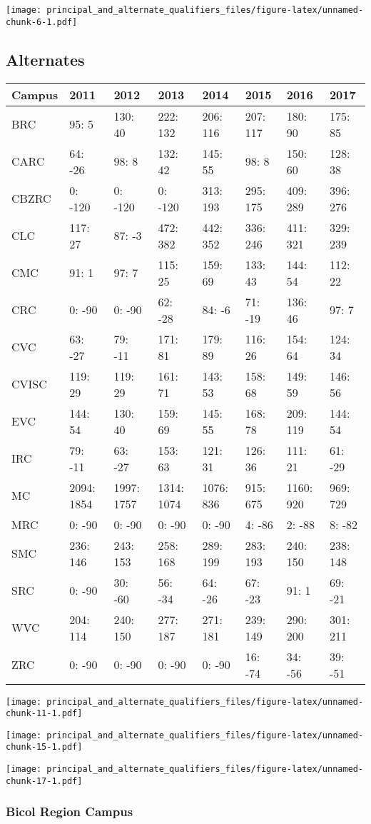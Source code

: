 \documentclass[]{article}
\begin{document}
\texttt{[image: principal\_and\_alternate\_qualifiers\_files/figure-latex/unnamed-chunk-6-1.pdf]}

\hypertarget{alternates}{%
\subsection{Alternates}\label{alternates}}

\begin{longtable}[]{@{}llllllll@{}}
\toprule
Campus & 2011 & 2012 & 2013 & 2014 & 2015 & 2016 & 2017\tabularnewline
\midrule
\endhead
BRC & 95: 5 & 130: 40 & 222: 132 & 206: 116 & 207: 117 & 180: 90 & 175:
85\tabularnewline
CARC & 64: -26 & 98: 8 & 132: 42 & 145: 55 & 98: 8 & 150: 60 & 128:
38\tabularnewline
CBZRC & 0: -120 & 0: -120 & 0: -120 & 313: 193 & 295: 175 & 409: 289 &
396: 276\tabularnewline
CLC & 117: 27 & 87: -3 & 472: 382 & 442: 352 & 336: 246 & 411: 321 &
329: 239\tabularnewline
CMC & 91: 1 & 97: 7 & 115: 25 & 159: 69 & 133: 43 & 144: 54 & 112:
22\tabularnewline
CRC & 0: -90 & 0: -90 & 62: -28 & 84: -6 & 71: -19 & 136: 46 & 97:
7\tabularnewline
CVC & 63: -27 & 79: -11 & 171: 81 & 179: 89 & 116: 26 & 154: 64 & 124:
34\tabularnewline
CVISC & 119: 29 & 119: 29 & 161: 71 & 143: 53 & 158: 68 & 149: 59 & 146:
56\tabularnewline
EVC & 144: 54 & 130: 40 & 159: 69 & 145: 55 & 168: 78 & 209: 119 & 144:
54\tabularnewline
IRC & 79: -11 & 63: -27 & 153: 63 & 121: 31 & 126: 36 & 111: 21 & 61:
-29\tabularnewline
MC & 2094: 1854 & 1997: 1757 & 1314: 1074 & 1076: 836 & 915: 675 & 1160:
920 & 969: 729\tabularnewline
MRC & 0: -90 & 0: -90 & 0: -90 & 0: -90 & 4: -86 & 2: -88 & 8:
-82\tabularnewline
SMC & 236: 146 & 243: 153 & 258: 168 & 289: 199 & 283: 193 & 240: 150 &
238: 148\tabularnewline
SRC & 0: -90 & 30: -60 & 56: -34 & 64: -26 & 67: -23 & 91: 1 & 69:
-21\tabularnewline
WVC & 204: 114 & 240: 150 & 277: 187 & 271: 181 & 239: 149 & 290: 200 &
301: 211\tabularnewline
ZRC & 0: -90 & 0: -90 & 0: -90 & 0: -90 & 16: -74 & 34: -56 & 39:
-51\tabularnewline
\bottomrule
\end{longtable}

\texttt{[image: principal\_and\_alternate\_qualifiers\_files/figure-latex/unnamed-chunk-11-1.pdf]}

\texttt{[image: principal\_and\_alternate\_qualifiers\_files/figure-latex/unnamed-chunk-15-1.pdf]}

\texttt{[image: principal\_and\_alternate\_qualifiers\_files/figure-latex/unnamed-chunk-17-1.pdf]}

\hypertarget{bicol-region-campus}{%
\subsubsection{Bicol Region Campus}\label{bicol-region-campus}}
\end{document}
